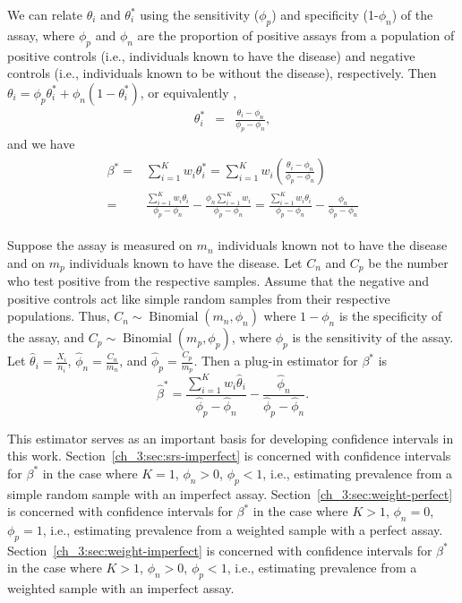 We can relate $\theta_i$ and $\theta_i^*$ using the sensitivity ($\phi_p$) and specificity (1-$\phi_n$) of the assay,
where $\phi_p$ and $\phi_n$ are the proportion of positive assays from a population of positive controls (i.e., individuals known to have the disease) and
negative controls (i.e., individuals known to be without the disease), respectively. Then
$\theta_i = \phi_p \theta_i^* + \phi_n (1-\theta_i^*)$, or equivalently \citep{Roga:1978},
\begin{eqnarray*}
\theta_i^* & = & \frac{ \theta_i - \phi_n }{\phi_p - \phi_n},
\end{eqnarray*}
and we have
\begin{align}
\begin{split}
  \beta^*   =&   \sum_{i=1}^K w_i \theta_i^*
            =  \sum_{i=1}^K w_i \left( \frac{\theta_i - \phi_n}{\phi_p - \phi_n} \right) \\
            =&   \frac{\sum_{i=1}^K w_i \theta_i}{\phi_p - \phi_n} - \frac{\phi_n \sum_{i=1}^K w_i}{\phi_p - \phi_n}
            =   \frac{\sum_{i=1}^K w_i \theta_i}{\phi_p - \phi_n} - \frac{\phi_n}{\phi_p - \phi_n}
            \label{ch_3:eq:long-beta}
\end{split}
\end{align}


Suppose the assay is measured on \( m_n \) individuals known not to have the disease and on \( m_p \) individuals known to have the disease.
Let \( C_n \) and \( C_p \) be the number who test positive from the respective samples.
Assume that the negative and positive controls act like simple random samples from their respective populations.
Thus, \( C_n \sim \operatorname{Binomial}(m_n, \phi_n) \) where \( 1 - \phi_n \) is the specificity of the assay, and \( C_p \sim \operatorname{Binomial}(m_p, \phi_p) \), where \( \phi_p \) is the sensitivity of the assay.
Let \( \hat{\theta}_i = \frac{X_i}{n_i} \), \( \hat{\phi}_n = \frac{C_n}{m_n} \), and \( \hat{\phi}_p = \frac{C_p}{m_p} \).
Then a plug-in estimator for \( \beta^* \) is
\begin{equation}
    \hat{\beta}^* = \frac{\sum_{i=1}^K w_i \hat{\theta}_i}{\hat{\phi}_p - \hat{\phi}_n} - \frac{\hat{\phi}_n}{\hat{\phi}_p - \hat{\phi}_n}. \label{ch_3:eq:betastarhat}
\end{equation}

This estimator serves as an important basis for developing confidence intervals in this work.
Section~\ref{ch_3:sec:srs-imperfect} is concerned with confidence intervals for \( \beta^* \) in the case where \( K = 1 \), \( \phi_n > 0 \), \( \phi_p < 1 \), i.e., estimating prevalence from a simple random sample with an imperfect assay.
Section~\ref{ch_3:sec:weight-perfect} is concerned with confidence intervals for \( \beta^* \) in the case where \( K > 1 \), \( \phi_n = 0 \), \( \phi_p = 1 \), i.e., estimating prevalence from a weighted sample with a perfect assay.
Section~\ref{ch_3:sec:weight-imperfect} is concerned with confidence intervals for \( \beta^* \) in the case where \( K > 1 \), \( \phi_n > 0 \), \( \phi_p < 1 \), i.e., estimating prevalence from a weighted sample with an imperfect assay.


